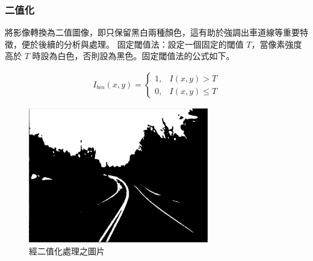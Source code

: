 \documentclass[12pt]{article}       %
\begin{document}
\subsubsection{二值化}
\hspace{2em}將影像轉換為二值圖像，即只保留黑白兩種顏色，這有助於強調出車道線等重要特徵，便於後續的分析與處理。
固定閾值法：設定一個固定的閾值 $T$，當像素強度高於 $T$ 時設為白色，否則設為黑色。固定閾值法的公式如下。

\begin{align}
    I_{bin}(x,y) = 
    \begin{cases}
        1, & I(x,y) > T \\
        0, & I(x,y) \leq T
    \end{cases}
\end{align}

\begin{figure}[H]
    \centering
    \includegraphics[width=0.7\textwidth]{4.png}     %
    \caption{經二值化處理之圖片}    %
    \label{fig:4}    %
\end{figure}

\end{document}
